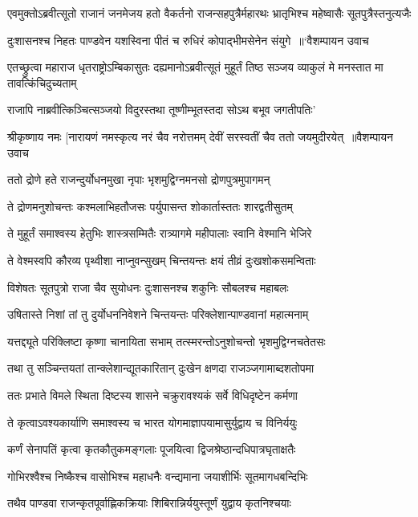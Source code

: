 \threelineshloka
{एवमुक्तोऽब्रवीत्सूतो राजानं जनमेजय}
{हतो वैकर्तनो राजन्सहपुत्रैर्महारथः}
{भ्रातृभिश्च महेष्वासैः सूतपुत्रैस्तनुत्यजैः}


\threelineshloka
{दुःशासनश्च निहतः पाण्डवेन यशस्विना}
{पीतं च रुधिरं कोपाद्भीमसेनेन संयुगे ॥`वैशम्पायन उवाच}
{}


\threelineshloka
{एतच्छ्रुत्वा महाराज धृतराष्ट्रोऽम्बिकासुतः}
{दह्यमानोऽब्रवीत्सूतं मुहूर्तं तिष्ठ सञ्जय}
{व्याकुलं मे मनस्तात मा तावत्किंचिदुच्यताम्}


\twolineshloka
{राजापि नाब्रवीत्किञ्चित्सञ्जयो विदुरस्तथा}
{तूष्णीम्भूतस्तदा सोऽथ बभूव जगतीपतिः'}


श्रीकृष्णाय नमः
\threelineshloka
{[नारायणं नमस्कृत्य नरं चैव नरोत्तमम्}
{देवीं सरस्वतीं चैव ततो जयमुदीरयेत् ॥वैशम्पायन उवाच}
{}


\twolineshloka
{ततो द्रोणे हते राजन्दुर्योधनमुखा नृपाः}
{भृशमुद्विग्नमनसो द्रोणपुत्रमुपागमन्}


\twolineshloka
{ते द्रोणमनुशोचन्तः कश्मलाभिहतौजसः}
{पर्युपासन्त शोकार्तास्ततः शारद्वतीसुतम्}


\twolineshloka
{ते मुहूर्तं समाश्वस्य हेतुभिः शास्त्रसम्मितैः}
{रात्र्यागमे महीपालाः स्वानि वेश्मानि भेजिरे}


\twolineshloka
{ते वेश्मस्वपि कौरव्य पृथ्वीशा नाप्नुवन्सुखम्}
{चिन्तयन्तः क्षयं तीव्रं दुःखशोकसमन्विताः}


\twolineshloka
{विशेषतः सूतपुत्रो राजा चैव सुयोधनः}
{दुःशासनश्च शकुनिः सौबलश्च महाबलः}


\twolineshloka
{उषितास्ते निशां तां तु दुर्योधननिवेशने}
{चिन्तयन्तः परिक्लेशान्पाण्डवानां महात्मनाम्}


\twolineshloka
{यत्तद्द्यूते परिक्लिष्टा कृष्णा चानायिता सभाम्}
{तत्स्मरन्तोऽनुशोचन्तो भृशमुद्विग्नचतेतसः}


\twolineshloka
{तथा तु सञ्चिन्तयतां तान्क्लेशान्द्यूतकारितान्}
{दुःखेन क्षणदा राजञ्जगामाब्दशतोपमा}


\twolineshloka
{ततः प्रभाते विमले स्थिता दिष्टस्य शासने}
{चक्रुरावश्यकं सर्वे विधिदृष्टेन कर्मणा}


\twolineshloka
{ते कृत्वाऽवश्यकार्याणि समाश्वस्य च भारत}
{योगमाज्ञापयामासुर्युद्वाय च विनिर्ययुः}


\twolineshloka
{कर्णं सेनापतिं कृत्वा कृतकौतुकमङ्गलाः}
{पूजयित्वा द्विजश्रेष्ठान्दधिपात्रघृताक्षतैः}


\twolineshloka
{गोभिरश्वैश्च निष्कैश्च वासोभिश्च महाधनैः}
{वन्द्यमाना जयाशीर्भिः सूतमागधबन्दिभिः}


\twolineshloka
{तथैव पाण्डवा राजन्कृतपूर्वाह्णिकक्रियाः}
{शिबिरान्निर्ययुस्तूर्णं युद्वाय कृतनिश्चयाः}


